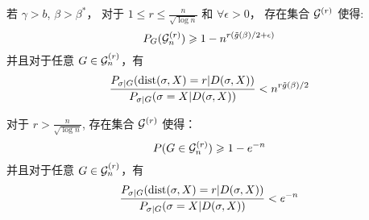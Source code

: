 \begin{lemma}\label{prop:small}
  若 $\gamma>b$, $\beta>\beta^\ast$，
  对于 $1\leq r \leq \frac{n}{\sqrt{\log n}}$
  和 $\forall \epsilon > 0$，
  存在集合 $\mathcal{G}^{(r)}$ 使得:
\begin{equation}\label{eq:Gr}
  P_G(\mathcal{G}^{(r)}_n) \geqslant 1 - n^{r(\tilde{g}(\beta)/2 + \epsilon)}
  \end{equation}
  并且对于任意 $G\in\mathcal{G}^{(r)}_n$，有
\begin{equation}\label{eq:psigmaX}
  \frac{P_{\sigma|G}(\operatorname{dist}(\sigma, X)=r | D(\sigma, X))}
  {P_{\sigma|G}(\sigma=X | D(\sigma, X))} <
  n^{r \tilde{g}(\beta) /2}
  \end{equation}
  
  对于 $r> \frac{n}{\sqrt{\log n}}$, 存在集合 $\mathcal{G}^{(r)}$ 使得：
\begin{equation}\label{eq:Gr1}
  P(G\in\mathcal{G}^{(r)}_n) \geqslant 1 - e^{-n}
  \end{equation}
  并且对于任意 $G\in\mathcal{G}^{(r)}_n$，有
\begin{equation}\label{eq:psigmaX1}
  \frac{P_{\sigma|G}(\operatorname{dist}(\sigma, X)=r | D(\sigma, X))}
  {P_{\sigma|G}(\sigma=X | D(\sigma, X))} <
  e^{-n}
  \end{equation}
\end{lemma}
